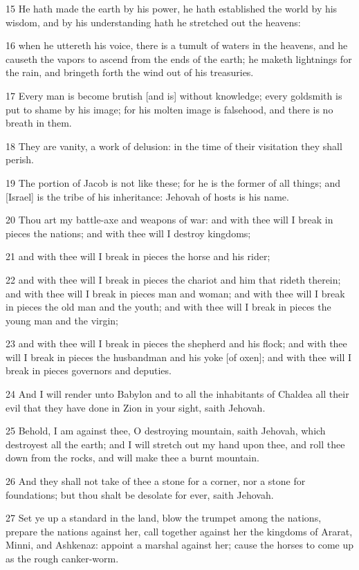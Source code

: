 \par 15 He hath made the earth by his power, he hath established the world by his wisdom, and by his understanding hath he stretched out the heavens:
\par 16 when he uttereth his voice, there is a tumult of waters in the heavens, and he causeth the vapors to ascend from the ends of the earth; he maketh lightnings for the rain, and bringeth forth the wind out of his treasuries.
\par 17 Every man is become brutish [and is] without knowledge; every goldsmith is put to shame by his image; for his molten image is falsehood, and there is no breath in them.
\par 18 They are vanity, a work of delusion: in the time of their visitation they shall perish.
\par 19 The portion of Jacob is not like these; for he is the former of all things; and [Israel] is the tribe of his inheritance: Jehovah of hosts is his name.
\par 20 Thou art my battle-axe and weapons of war: and with thee will I break in pieces the nations; and with thee will I destroy kingdoms;
\par 21 and with thee will I break in pieces the horse and his rider;
\par 22 and with thee will I break in pieces the chariot and him that rideth therein; and with thee will I break in pieces man and woman; and with thee will I break in pieces the old man and the youth; and with thee will I break in pieces the young man and the virgin;
\par 23 and with thee will I break in pieces the shepherd and his flock; and with thee will I break in pieces the husbandman and his yoke [of oxen]; and with thee will I break in pieces governors and deputies.
\par 24 And I will render unto Babylon and to all the inhabitants of Chaldea all their evil that they have done in Zion in your sight, saith Jehovah.
\par 25 Behold, I am against thee, O destroying mountain, saith Jehovah, which destroyest all the earth; and I will stretch out my hand upon thee, and roll thee down from the rocks, and will make thee a burnt mountain.
\par 26 And they shall not take of thee a stone for a corner, nor a stone for foundations; but thou shalt be desolate for ever, saith Jehovah.
\par 27 Set ye up a standard in the land, blow the trumpet among the nations, prepare the nations against her, call together against her the kingdoms of Ararat, Minni, and Ashkenaz: appoint a marshal against her; cause the horses to come up as the rough canker-worm.
